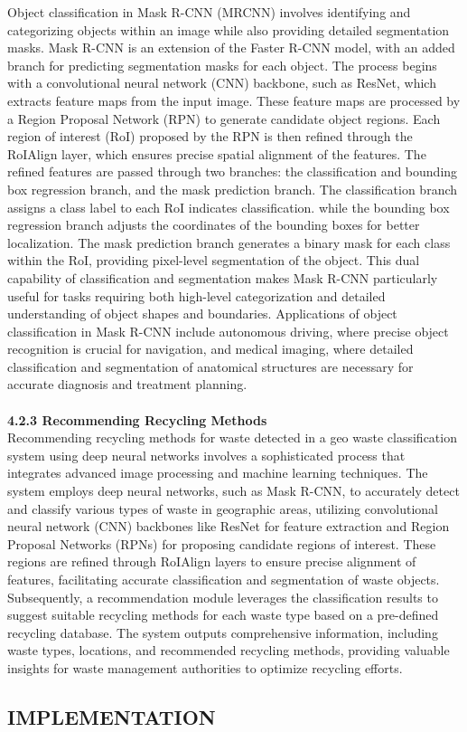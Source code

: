 \documentclass[12pt, English]{article}
\begin{document}
Object classification in Mask R-CNN (MRCNN) involves identifying and categorizing objects within an image while also providing detailed segmentation masks. Mask R-CNN is an extension of the Faster R-CNN model, with an added branch for predicting segmentation masks for each object. The process begins with a convolutional neural network (CNN) backbone, such as ResNet, which extracts feature maps from the input image. These feature maps are processed by a Region Proposal Network (RPN) to generate candidate object regions. Each region of interest (RoI) proposed by the RPN is then refined through the RoIAlign layer, which ensures precise spatial alignment of the features. The refined features are passed through two branches: the classification and bounding box regression branch, and the mask prediction branch. The classification branch assigns a class label to each RoI indicates classification. while the bounding box regression branch adjusts the coordinates of the bounding boxes for better localization. The mask prediction branch generates a binary mask for each class within the RoI, providing pixel-level segmentation of the object. This dual capability of classification and segmentation makes Mask R-CNN particularly useful for tasks requiring both high-level categorization and detailed understanding of object shapes and boundaries. Applications of object classification in Mask R-CNN include autonomous driving, where precise object recognition is crucial for navigation, and medical imaging, where detailed classification and segmentation of anatomical structures are necessary for accurate diagnosis and treatment planning.\\
\\
\textbf{4.2.3 Recommending Recycling Methods}\\
Recommending recycling methods for waste detected in a geo waste classification system using deep neural networks involves a sophisticated process that integrates advanced image processing and machine learning techniques. The system employs deep neural networks, such as Mask R-CNN, to accurately detect and classify various types of waste in geographic areas, utilizing convolutional neural network (CNN) backbones like ResNet for feature extraction and Region Proposal Networks (RPNs) for proposing candidate regions of interest. These regions are refined through RoIAlign layers to ensure precise alignment of features, facilitating accurate classification and segmentation of waste objects. Subsequently, a recommendation module leverages the classification results to suggest suitable recycling methods for each waste type based on a pre-defined recycling database. The system outputs comprehensive information, including waste types, locations, and recommended recycling methods, providing valuable insights for waste management authorities to optimize recycling efforts.
\newpage
\begin{center}
\section{ \Large IMPLEMENTATION }
\end{center}\\
\end{document}

